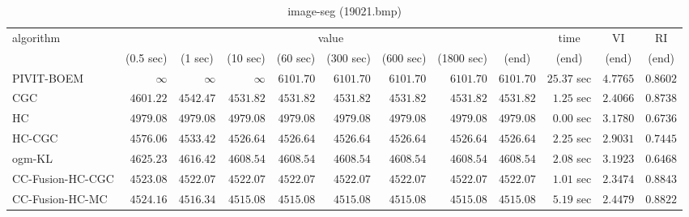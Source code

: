 \begin{table}[H]
\scriptsize
\centering
\caption{image-seg (19021.bmp)}
\label{tab:anytimetable-image-seg-19021.bmp}
\begin{tabular}{lrrrrrrrrrrr}
\toprule
           algorithm &                                   \multicolumn{8}{c}{value} & \multicolumn{1}{c}{time}    & \multicolumn{1}{c}{VI}  & \multicolumn{1}{c}{RI} \\  
\cmidrule(lr){2-9}\cmidrule(lr){10-10} \cmidrule(lr){11-11} \cmidrule(lr){12-12}   
                     & \multicolumn{1}{c}{(0.5 sec)} & \multicolumn{1}{c}{(1 sec)} & \multicolumn{1}{c}{(10 sec)} & \multicolumn{1}{c}{(60 sec)} & \multicolumn{1}{c}{(300 sec)} & \multicolumn{1}{c}{(600 sec)} & \multicolumn{1}{c}{(1800 sec)} & \multicolumn{1}{c}{(end)} & \multicolumn{1}{c}{(end)}    & \multicolumn{1}{c}{(end)}   & \multicolumn{1}{c}{(end)}  \\ \midrule 
          PIVIT-BOEM & $\infty$ & $\infty$ & $\infty$ & $      6101.70$ & $      6101.70$ & $      6101.70$ & $      6101.70$ & $      6101.70$ & $        25.37$ sec    & $       4.7765$  & $       0.8602$ \\ 
                 CGC & $      4601.22$ & $      4542.47$ & $      4531.82$ & $      4531.82$ & $      4531.82$ & $      4531.82$ & $      4531.82$ & $      4531.82$ & $         1.25$ sec    & $       2.4066$  & $       0.8738$ \\ 
                  HC & $      4979.08$ & $      4979.08$ & $      4979.08$ & $      4979.08$ & $      4979.08$ & $      4979.08$ & $      4979.08$ & $      4979.08$ & $         0.00$ sec    & $       3.1780$  & $       0.6736$ \\ 
              HC-CGC & $      4576.06$ & $      4533.42$ & $      4526.64$ & $      4526.64$ & $      4526.64$ & $      4526.64$ & $      4526.64$ & $      4526.64$ & $         2.25$ sec    & $       2.9031$  & $       0.7445$ \\ 
              ogm-KL & $      4625.23$ & $      4616.42$ & $      4608.54$ & $      4608.54$ & $      4608.54$ & $      4608.54$ & $      4608.54$ & $      4608.54$ & $         2.08$ sec    & $       3.1923$  & $       0.6468$ \\ 
    CC-Fusion-HC-CGC & $      4523.08$ & $      4522.07$ & $      4522.07$ & $      4522.07$ & $      4522.07$ & $      4522.07$ & $      4522.07$ & $      4522.07$ & $         1.01$ sec    & $       2.3474$  & $       0.8843$ \\ 
     CC-Fusion-HC-MC & $      4524.16$ & $      4516.34$ & $      4515.08$ & $      4515.08$ & $      4515.08$ & $      4515.08$ & $      4515.08$ & $      4515.08$ & $         5.19$ sec    & $       2.4479$  & $       0.8822$ \\ 

\end{tabular}
\end{table}
